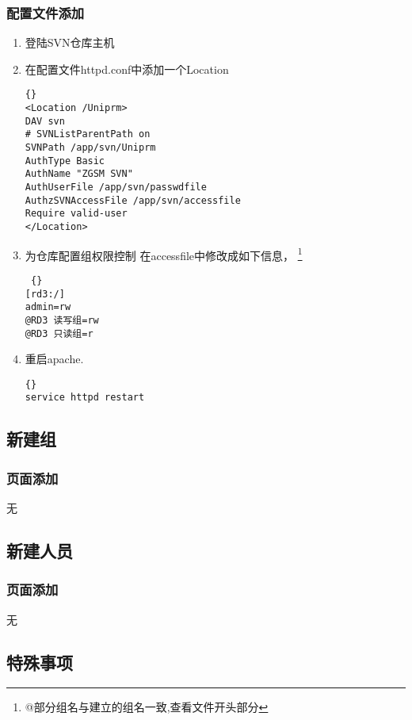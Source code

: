 \documentclass[11pt,a4paper]{article}
\begin{document}
	\subsubsection {配置文件添加} 
		\begin{enumerate}[step 1]
		\item 登陆SVN仓库主机
		\item 在配置文件httpd.conf中添加一个Location
		\begin{lstlisting}[language={[ANSI]C}] {}
<Location /Uniprm>
DAV svn
# SVNListParentPath on
SVNPath /app/svn/Uniprm
AuthType Basic
AuthName "ZGSM SVN"
AuthUserFile /app/svn/passwdfile
AuthzSVNAccessFile /app/svn/accessfile
Require valid-user
</Location>
		\end{lstlisting}
		\item 为仓库配置组权限控制 在accessfile中修改成如下信息， 
		\footnote{@部分组名与建立的组名一致,查看文件开头部分}
		\begin{lstlisting} {}
[rd3:/]
admin=rw
@RD3 读写组=rw
@RD3 只读组=r  
		\end{lstlisting}

		\item 重启apache. 
		\begin{lstlisting}[language={[ANSI]C}] {}
service httpd restart
		\end{lstlisting}
		\end{enumerate}
		
	\subsection {新建组}
	\subsubsection{页面添加}
	无

	\subsection {新建人员}
	\subsubsection{页面添加}
	无

	\subsection {特殊事项}
\end{document}
